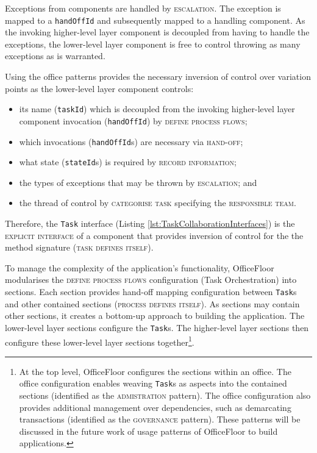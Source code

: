 \documentclass[prodmode]{style/acmlarge}
\begin{document}
Exceptions from components are handled by \textsc{escalation}.  The
exception is mapped to a \texttt{handOffId} and subsequently mapped to a
handling component.  As the invoking higher-level layer component is decoupled
from having to handle the exceptions, the lower-level layer component is free to
control throwing as many exceptions as is warranted.

Using the office patterns provides the necessary inversion of control over
variation points as the lower-level layer component controls:
\begin{itemize}
  \item its name (\texttt{taskId}) which is decoupled from the invoking higher-level layer component invocation (\texttt{handOffId}) by \textsc{define process flows};
  \item which invocations (\texttt{handOffId}s) are necessary via \textsc{hand-off};
  \item what state (\texttt{stateId}s) is required by \textsc{record information};
  \item the types of exceptions that may be thrown by \textsc{escalation}; and
  \item the thread of control by \textsc{categorise task} specifying the \textsc{responsible team}.
\end{itemize}

Therefore, the \texttt{Task} interface (Listing
\ref{lst:TaskCollaborationInterfaces}) is the \textsc{explicit interface} of a
component that provides inversion of control for the the method signature
(\textsc{task defines itself}).

To manage the complexity of the application's functionality, OfficeFloor
modularises the \textsc{define process flows} configuration (Task Orchestration)
into sections.  Each section provides hand-off mapping configuration between
\texttt{Task}s and other contained sections (\textsc{process defines itself}).
As sections may contain other sections, it creates a bottom-up approach to
building the application.  The lower-level layer sections configure the
\texttt{Task}s.  The higher-level layer sections then configure these
lower-level layer sections together\footnote{At the top level, OfficeFloor
configures the sections within an office.  The office configuration enables
weaving \texttt{Task}s as aspects into the contained sections (identified as the
\textsc{admistration} pattern).  The office configuration also provides
additional management over dependencies, such as demarcating transactions
(identified as the \textsc{governance} pattern).  These patterns will be
discussed in the future work of usage patterns of OfficeFloor to build
applications.}.
\end{document}
